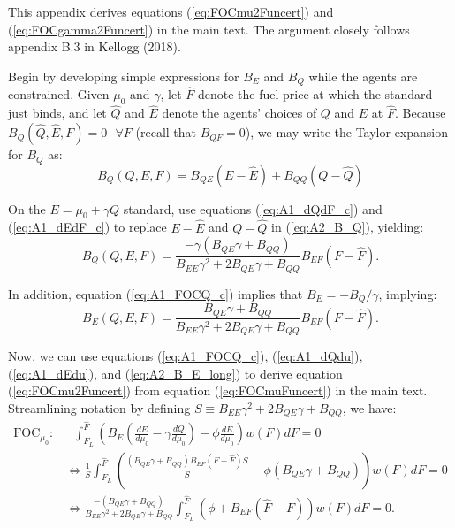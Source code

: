 \documentclass[12pt]{article}
\begin{document}
This appendix derives equations (\ref{eq:FOCmu2Funcert}) and (\ref{eq:FOCgamma2Funcert}) in the main text. The argument closely follows appendix B.3 in Kellogg (2018).

Begin by developing simple expressions for $B_E$ and $B_Q$ while the agents are constrained. Given $\mu_0$ and $\gamma$, let $\hat{F}$ denote the fuel price at which the standard just binds, and let $\hat{Q}$ and $\hat{E}$ denote the agents' choices of $Q$ and $E$ at $\hat{F}$. Because $B_Q(\hat{Q},\hat{E},F)=0 \text{ }\forall F$ (recall that $B_{QF}=0$), we may write the Taylor expansion for $B_Q$ as:
\begin{equation}
B_Q(Q,E,F)=B_{QE}(E-\hat{E})+B_{QQ}(Q-\hat{Q}) \label{eq:A2_B_Q}
\end{equation}

On the $E=\mu_0+\gamma Q$ standard, use equations (\ref{eq:A1_dQdF_c}) and (\ref{eq:A1_dEdF_c}) to replace $E-\hat{E}$ and $Q-\hat{Q}$ in (\ref{eq:A2_B_Q}), yielding:
\begin{equation}
B_Q(Q,E,F)=\frac{-\gamma(B_{QE}\gamma+B_{QQ})}{B_{EE}\gamma^2+2B_{QE}\gamma+B_{QQ}}B_{EF}(F-\hat{F}). \label{eq:A2_B_Q_long}
\end{equation}

In addition, equation (\ref{eq:A1_FOCQ_c}) implies that $B_E = -B_Q / \gamma$, implying:
\begin{equation}
B_E(Q,E,F)=\frac{B_{QE}\gamma+B_{QQ}}{B_{EE}\gamma^2+2B_{QE}\gamma+B_{QQ}}B_{EF}(F-\hat{F}). \label{eq:A2_B_E_long}
\end{equation}

Now, we can use equations (\ref{eq:A1_FOCQ_c}), (\ref{eq:A1_dQdu}), (\ref{eq:A1_dEdu}), and (\ref{eq:A2_B_E_long}) to derive equation (\ref{eq:FOCmu2Funcert}) from equation (\ref{eq:FOCmuFuncert}) in the main text. Streamlining notation by defining $S\equiv B_{EE}\gamma^2+2B_{QE}\gamma+B_{QQ}$, we have:
\begin{align}
\text{FOC}_{\mu_0}:& \text{ } \int_{F_L}^{\hat{F}}\left(B_E(\frac{dE}{d\mu_0}-\gamma\frac{dQ}{d\mu_0}) -\phi\frac{dE}{d\mu_0}\right)w(F)dF = 0 \\
&\Leftrightarrow \frac{1}{S}\int_{F_L}^{\hat{F}}\left(\frac{(B_{QE}\gamma+B_{QQ})B_{EF}(F-\hat{F})S}{S}-\phi(B_{QE}\gamma+B_{QQ})\right)w(F)dF = 0 \\
&\Leftrightarrow \frac{-(B_{QE}\gamma+B_{QQ})}{B_{EE}\gamma^2+2B_{QE}\gamma+B_{QQ}} \int_{F_L}^{\hat{F}}\left(\phi+B_{EF}(\hat{F}-F)\right)w(F)dF=0. \label{eq:A2_FOCmu2Funcert}
\end{align}
\end{document}
